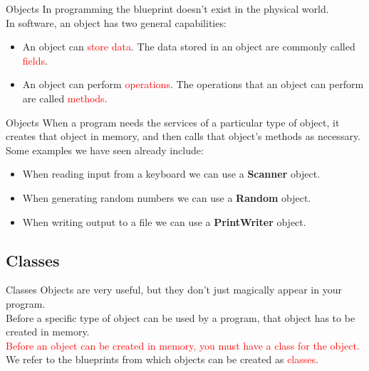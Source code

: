 \documentclass[11pt]{beamer}
\newcommand{\red}[1]{\textcolor{red}{#1}}
\begin{document}
\begin{frame}{Objects}
    In programming the blueprint doesn't exist in the physical world. \\ 
    \vspace{1em}
    In software, an object has two general capabilities: \\ 
    \vspace{1em}
    \begin{itemize}
        \item An object can \red{store data}. The data stored in an object are commonly called \red{fields}.
        \item An object can perform \red{operations}. The operations that an object can perform are called \red{methods}.
    \end{itemize}
\end{frame}

\begin{frame}{Objects}
    When a program needs the services of a particular type of object, it creates that object in memory, and then calls that object’s methods as necessary. \\ 
    \vspace{1em}
    Some examples we have seen already include: \\
    \vspace{1em}
    \begin{itemize}
        \item When reading input from a keyboard we can use a \textbf{Scanner} object.
        \item When generating random numbers we can use a \textbf{Random} object.
        \item When writing output to a file we can use a \textbf{PrintWriter} object.
    \end{itemize}
\end{frame}

\subsection{Classes}
\begin{frame}{Classes}
    Objects are very useful, but they don’t just magically appear in your program. \\ 
    \vspace{1em}
    Before a specific type of object can be used by a program, that object has to be created in memory. \\
    \vspace{1em}
    \red{Before an object can be created in memory, you must have a class for the object.} \\ 
    \vspace{1em}
    We refer to the blueprints from which objects can be created as \red{classes}. \\ 
\end{frame}
\end{document}

